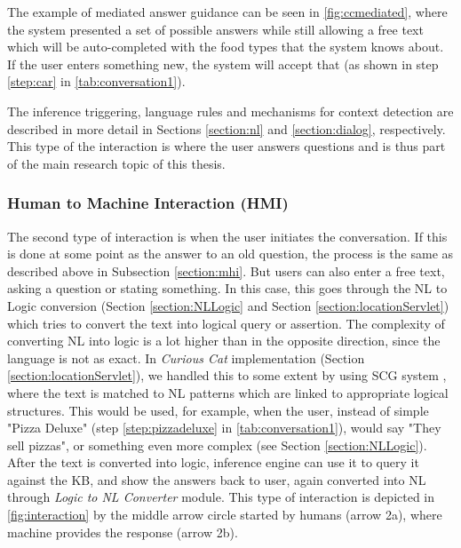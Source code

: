 The example of mediated answer guidance can be seen in \autoref{fig:ccmediated},
where the system presented a set of possible answers while still allowing a 
free text 
which will be auto-completed with the food types that the system knows about. 
If the user enters something new, the system will accept that (as shown 
in step \ref{step:car} in \autoref{tab:conversation1}).

The inference triggering, language rules and mechanisms for context detection
are described in more detail in Sections \ref{section:nl} and 
\ref{section:dialog}, respectively. This
type of the interaction is where the user answers questions and is thus part of
the main research topic of this thesis.

\subsubsection{Human to Machine Interaction (HMI)}
\label{section:hmi}
The second type of interaction is when the user initiates the conversation. 
If this is done at some point as the answer to an old question, the process is 
the same as described above in Subsection \ref{section:mhi}. But users can 
also enter a free text, asking a question or stating something. In this case, this goes through the NL to Logic conversion (Section \ref{section:NLLogic} and Section \ref{section:locationServlet}) which tries to convert the
text into logical query or assertion. The complexity of converting NL into logic is a lot higher than in the opposite direction, since the language is not
as exact. In \emph{Curious Cat} implementation (Section \ref{section:locationServlet}), we handled this to some extent by using SCG system \parencite{Schneider2015}, where the text is matched to NL patterns which are linked to appropriate logical structures.
This would be used, for example, when the user, instead of simple "Pizza Deluxe" 
(step \ref{step:pizzadeluxe} in \autoref{tab:conversation1}), would say 
"They sell pizzas", or something even more complex (see Section 
\ref{section:NLLogic}). After the text is converted into logic, inference engine can use it to query it against the KB, and show the answers back to user, again converted into NL through \emph{Logic to NL Converter} module. This type of interaction is depicted in \autoref{fig:interaction} by the middle arrow circle
started by humans (arrow 2a), where machine provides the response (arrow 2b).

